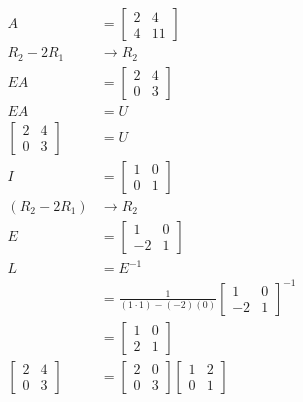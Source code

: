 \documentclass[main.tex]{subfiles}
\begin{document}
\begin{enumerate}
    $$
    \begin{aligned}
    A &= \left[\begin{array}{cc}
    2 & 4 \\
    4 & 11
    \end{array}\right]\\
    R_{2}-2 R_{1} & \rightarrow R_2\\
    E A &= \left[\begin{array}{ll}
    2 & 4 \\
    0 & 3
    \end{array}\right]\\
    E A &= U\\
    \left[\begin{array}{ll}
    2 & 4 \\
    0 & 3
    \end{array}\right] &= U\\
    I &= \left[\begin{array}{ll}
    1 & 0 \\
    0 & 1
    \end{array}\right]\\
    \left(R_{2}-2 R_{1}\right) & \rightarrow R_2\\
    E &= \left[\begin{array}{cc}
    1 & 0 \\
    -2 & 1
    \end{array}\right]\\
    L &= E^{-1} \\
    & = \frac{1}{(1 \cdot 1)-(-2)(0)} \left[\begin{array}{cc}
    1 & 0 \\
    -2 & 1
    \end{array}\right]^{-1} \\
    & =\left[\begin{array}{ll}
    1 & 0 \\
    2 & 1
    \end{array}\right]\\
    \left[\begin{array}{ll}
    2 & 4 \\
    0 & 3
    \end{array}\right] &= \left[\begin{array}{ll}
    2 & 0 \\
    0 & 3
    \end{array}\right]\left[\begin{array}{ll}
    1 & 2 \\
    0 & 1
    \end{array}\right] \\

\end{aligned}$$
\end{enumerate}
\end{document}
